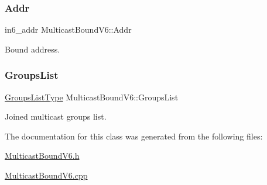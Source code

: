 \subsubsection{\texorpdfstring{Addr}{Addr}}
{\footnotesize\ttfamily in6\+\_\+addr Multicast\+Bound\+V6\+::\+Addr\hspace{0.3cm}{\ttfamily [protected]}}



Bound address. 

\mbox{\label{classMulticastBoundV6_a6ccdbb56f54017f5a4372eb816b5b077}} 
\subsubsection{\texorpdfstring{Groups\+List}{GroupsList}}
{\footnotesize\ttfamily \hyperlink{MulticastBound_8h_a9584173a620a338ea7d88264229e36dd}{Groups\+List\+Type} Multicast\+Bound\+V6\+::\+Groups\+List\hspace{0.3cm}{\ttfamily [protected]}}



Joined multicast groups list. 



The documentation for this class was generated from the following files\+:\begin{DoxyCompactItemize}
\item 
\hyperlink{MulticastBoundV6_8h}{Multicast\+Bound\+V6.\+h}\item 
\hyperlink{MulticastBoundV6_8cpp}{Multicast\+Bound\+V6.\+cpp}\end{DoxyCompactItemize}
